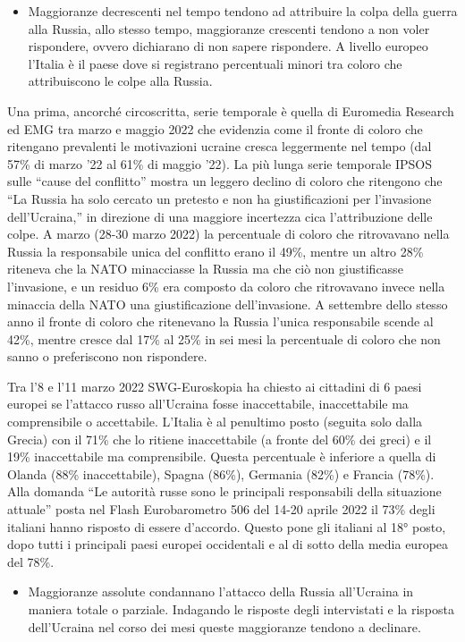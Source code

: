 \documentclass[
  openany]{book}
\providecommand{\tightlist}{%
  \setlength{\itemsep}{0pt}\setlength{\parskip}{0pt}}
\begin{document}
\begin{itemize}
\tightlist
\item
  Maggioranze decrescenti nel tempo tendono ad attribuire la colpa della guerra alla Russia, allo stesso tempo, maggioranze crescenti tendono a non voler rispondere, ovvero dichiarano di non sapere rispondere. A livello europeo l'Italia è il paese dove si registrano percentuali minori tra coloro che attribuiscono le colpe alla Russia.
\end{itemize}

Una prima, ancorché circoscritta, serie temporale è quella di Euromedia Research ed EMG tra marzo e maggio 2022 che evidenzia come il fronte di coloro che ritengano prevalenti le motivazioni ucraine cresca leggermente nel tempo (dal 57\% di marzo '22 al 61\% di maggio '22). La più lunga serie temporale IPSOS sulle ``cause del conflitto'' mostra un leggero declino di coloro che ritengono che ``La Russia ha solo cercato un pretesto e non ha giustificazioni per l'invasione dell'Ucraina,'' in direzione di una maggiore incertezza cica l'attribuzione delle colpe. A marzo (28-30 marzo 2022) la percentuale di coloro che ritrovavano nella Russia la responsabile unica del conflitto erano il 49\%, mentre un altro 28\% riteneva che la NATO minacciasse la Russia ma che ciò non giustificasse l'invasione, e un residuo 6\% era composto da coloro che ritrovavano invece nella minaccia della NATO una giustificazione dell'invasione. A settembre dello stesso anno il fronte di coloro che ritenevano la Russia l'unica responsabile scende al 42\%, mentre cresce dal 17\% al 25\% in sei mesi la percentuale di coloro che non sanno o preferiscono non rispondere.

Tra l'8 e l'11 marzo 2022 SWG-Euroskopia ha chiesto ai cittadini di 6 paesi europei se l'attacco russo all'Ucraina fosse inaccettabile, inaccettabile ma comprensibile o accettabile. L'Italia è al penultimo posto (seguita solo dalla Grecia) con il 71\% che lo ritiene inaccettabile (a fronte del 60\% dei greci) e il 19\% inaccettabile ma comprensibile. Questa percentuale è inferiore a quella di Olanda (88\% inaccettabile), Spagna (86\%), Germania (82\%) e Francia (78\%). Alla domanda ``Le autorità russe sono le principali responsabili della situazione attuale'' posta nel Flash Eurobarometro 506 del 14-20 aprile 2022 il 73\% degli italiani hanno risposto di essere d'accordo. Questo pone gli italiani al 18° posto, dopo tutti i principali paesi europei occidentali e al di sotto della media europea del 78\%.

\begin{itemize}
\tightlist
\item
  Maggioranze assolute condannano l'attacco della Russia all'Ucraina in maniera totale o parziale. Indagando le risposte degli intervistati e la risposta dell'Ucraina nel corso dei mesi queste maggioranze tendono a declinare.
\end{itemize}
\end{document}
